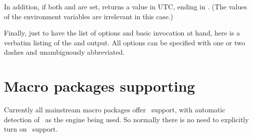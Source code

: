 \documentclass{pdftexmanual}
\begin{document}
In addition, if both  and
 are set,  returns a value
in UTC, ending in . (The values of the environment variables are
irrelevant in this case.)

Finally, just to have the list of options and basic invocation at hand,
here is a verbatim listing of the  and 
output. All options can be specified with one or two dashes and
unambiguously abbreviated.


\section{Macro packages supporting \PDFTEX}

Currently all mainstream macro packages offer \PDFTEX\ support, with
automatic detection of \PDFTEX\ as the engine being used. So normally
there is no need to explicitly turn on \PDFTEX\ support.
\end{document}
